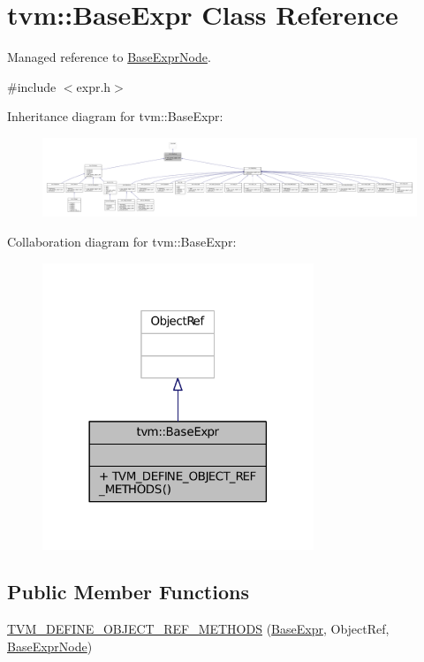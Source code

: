 \hypertarget{classtvm_1_1BaseExpr}{}\section{tvm\+:\+:Base\+Expr Class Reference}
\label{classtvm_1_1BaseExpr}


Managed reference to \hyperlink{classtvm_1_1BaseExprNode}{Base\+Expr\+Node}.  




{\ttfamily \#include $<$expr.\+h$>$}



Inheritance diagram for tvm\+:\+:Base\+Expr\+:
\nopagebreak
\begin{figure}[H]
\begin{center}
\leavevmode
\includegraphics[width=350pt]{classtvm_1_1BaseExpr__inherit__graph}
\end{center}
\end{figure}


Collaboration diagram for tvm\+:\+:Base\+Expr\+:
\nopagebreak
\begin{figure}[H]
\begin{center}
\leavevmode
\includegraphics[width=230pt]{classtvm_1_1BaseExpr__coll__graph}
\end{center}
\end{figure}
\subsection*{Public Member Functions}
\begin{DoxyCompactItemize}
\item 
\hyperlink{classtvm_1_1BaseExpr_aa513c6abed6e5b76c7fc9441649b3e4c}{T\+V\+M\+\_\+\+D\+E\+F\+I\+N\+E\+\_\+\+O\+B\+J\+E\+C\+T\+\_\+\+R\+E\+F\+\_\+\+M\+E\+T\+H\+O\+DS} (\hyperlink{classtvm_1_1BaseExpr}{Base\+Expr}, Object\+Ref, \hyperlink{classtvm_1_1BaseExprNode}{Base\+Expr\+Node})
\end{DoxyCompactItemize}


